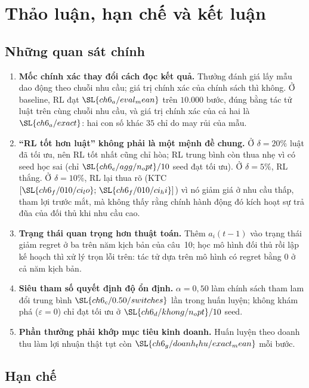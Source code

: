 \chapter{Thảo luận, hạn chế và kết luận}\label{chap:9}

\section{Những quan sát chính}

\begin{enumerate}
  \item \textbf{Mốc chính xác thay đổi cách đọc kết quả.} Thưởng đánh giá lấy mẫu dao động theo chuỗi nhu cầu; giá trị
    chính xác của chính sách thì không. Ở baseline, RL đạt $\SL{ch6_a/eval_mean}$ trên $10.000$ bước, đúng bằng tác tử luật
    trên cùng chuỗi nhu cầu, và giá trị chính xác của cả hai là $\SL{ch6_a/exact}$: hai con số khác $35$ chỉ do may rủi
    của mẫu.
  \item \textbf{``RL tốt hơn luật'' không phải là một mệnh đề chung.} Ở $\delta=20\%$ luật đã tối ưu, nên RL tốt nhất cũng
    chỉ hòa; RL trung bình còn thua nhẹ vì có seed học sai (chỉ $\SL{ch6_e/agg/n_opt}/10$ seed đạt tối ưu). Ở $\delta=5\%$, RL thắng.
    Ở $\delta=10\%$, RL lại thua rõ (KTC $[\SL{ch6_f/010/ci_lo};\,\SL{ch6_f/010/ci_hi}]$) vì nó giảm giá ở nhu cầu thấp,
    tham lợi trước mắt, mà không thấy rằng chính hành động đó kích hoạt sự trả đũa của đối thủ khi nhu cầu cao.
  \item \textbf{Trạng thái quan trọng hơn thuật toán.} Thêm $a_i(t-1)$ vào trạng thái giảm regret ở ba trên năm
    kịch bản của câu~10; học mô hình đối thủ rồi lập kế hoạch thì xử lý trọn lỗi trên: tác tử dựa trên mô hình có regret
    bằng $0$ ở cả năm kịch bản.
  \item \textbf{Siêu tham số quyết định độ ổn định.} $\alpha=0{,}50$ làm chính sách tham lam đổi trung bình
    $\SL{ch6_c/0.50/switches}$ lần trong huấn luyện; không khám phá ($\varepsilon=0$) chỉ đạt tối ưu ở
    $\SL{ch6_d/khong/n_opt}/10$ seed.
  \item \textbf{Phần thưởng phải khớp mục tiêu kinh doanh.} Huấn luyện theo doanh thu làm lợi nhuận thật tụt còn
    $\SL{ch6_g/doanh_thu/exact_mean}$ mỗi bước.
\end{enumerate}

\section{Hạn chế}

